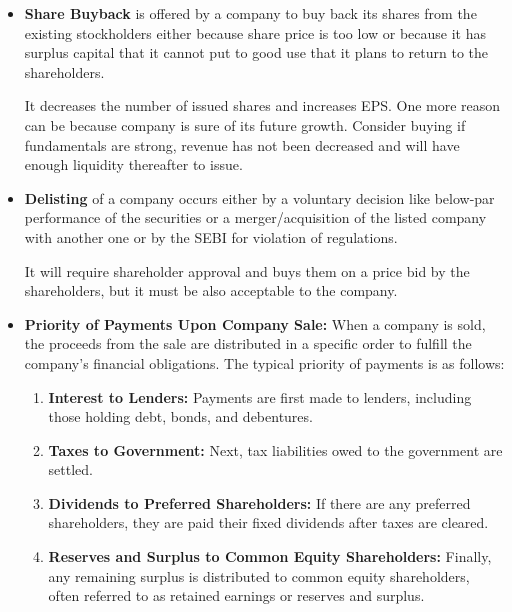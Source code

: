 \documentclass[12pt]{article}
\begin{document}
\begin{itemize}
    A 1:2 rights issue indicates that stockholders can buy 1 share for every 2 shares held. It's a right (not obligation) and can be traded. The share price also gets reduced in the same proportion. The number of issued shares also increases.

    \item \textbf{Share Buyback} is offered by a company to buy back its shares from the existing stockholders either because share price is too low or because it has surplus capital that it cannot put to good use that it plans to return to the shareholders. 

    It decreases the number of issued shares and increases EPS. One more reason can be because company is sure of its future growth. Consider buying if fundamentals are strong, revenue has not been decreased and will have enough liquidity thereafter to issue.

    \item \textbf{Delisting} of a company occurs either by a voluntary decision like below-par performance of the securities or a merger/acquisition of the listed company with another one or by the SEBI for violation of regulations. 

    It will require shareholder approval and buys them on a price bid by the shareholders, but it must be also acceptable to the company.

    \item \textbf{Priority of Payments Upon Company Sale:} When a company is sold, the proceeds from the sale are distributed in a specific order to fulfill the company's financial obligations. The typical priority of payments is as follows:
    \begin{enumerate}
      \item \textbf{Interest to Lenders:} Payments are first made to lenders, including those holding debt, bonds, and debentures.
      \item \textbf{Taxes to Government:} Next, tax liabilities owed to the government are settled.
      \item \textbf{Dividends to Preferred Shareholders:} If there are any preferred shareholders, they are paid their fixed dividends after taxes are cleared.
      \item \textbf{Reserves and Surplus to Common Equity Shareholders:} Finally, any remaining surplus is distributed to common equity shareholders, often referred to as retained earnings or reserves and surplus.
    \end{enumerate}

\end{itemize}
\end{document}
